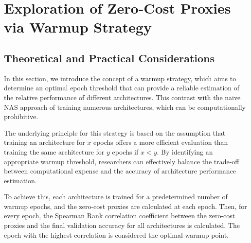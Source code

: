 \section{Exploration of Zero-Cost Proxies via Warmup Strategy}
\subsection{Theoretical and Practical Considerations}

\begin{comment}
    
The primary objective of \gls{NAS} is to discover high-performing architectures while minimising computational overhead. Training numerous architectures for a large number of epochs is computationally prohibitive. Training architectures for a limited number of epochs may be a more viable approach. In this context, we introduce the concept of a warmup strategy in this study, which aims to determine an optimal epoch threshold that can provide a reliable estimation of the relative performance of different architectures.
\end{comment}

In this section, we introduce the concept of a warmup strategy, which aims to determine an optimal epoch threshold that can provide a reliable estimation of the relative performance of different architectures. This contrast with the naive NAS approach of training numerous architectures, which can be computationally prohibitive. 

The underlying principle for this strategy is based on the assumption that training an architecture for $x$ epochs offers a more efficient evaluation than training the same architecture for $y$ epochs if $x < y$. By identifying an appropriate warmup threshold, researchers can effectively balance the trade-off between computational expense and the accuracy of architecture performance estimation.

To achieve this, each architecture is trained for a predetermined number of warmup epochs, and the zero-cost proxies are calculated at each epoch. Then, for every epoch, the Spearman Rank correlation coefficient between the zero-cost proxies and the final validation accuracy for all architectures is calculated. The epoch with the highest correlation is considered the optimal warmup point. 


